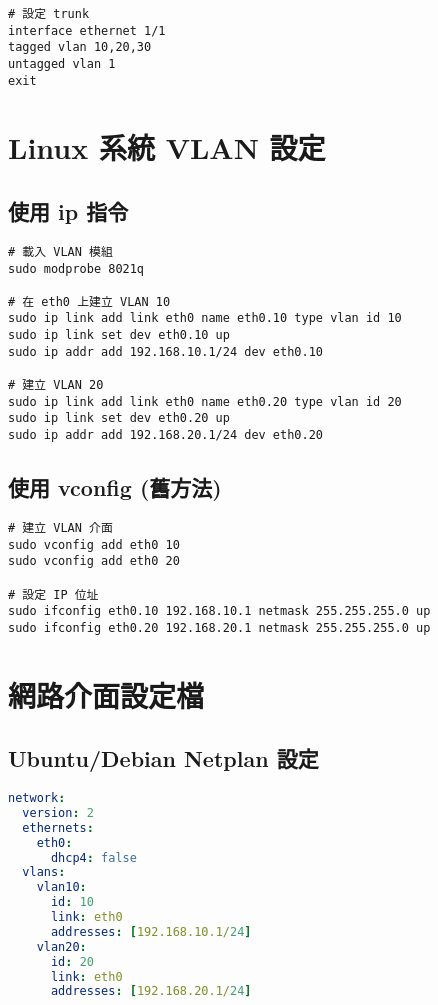 \documentclass[12pt,a4paper]{article}
\begin{document}
\begin{lstlisting}[caption=HP/Aruba Trunk 設定]
# 設定 trunk
interface ethernet 1/1
tagged vlan 10,20,30
untagged vlan 1
exit
\end{lstlisting}

\section{Linux 系統 VLAN 設定}

\subsection{使用 ip 指令}

\begin{lstlisting}[caption=建立 VLAN 介面]
# 載入 VLAN 模組
sudo modprobe 8021q

# 在 eth0 上建立 VLAN 10
sudo ip link add link eth0 name eth0.10 type vlan id 10
sudo ip link set dev eth0.10 up
sudo ip addr add 192.168.10.1/24 dev eth0.10

# 建立 VLAN 20
sudo ip link add link eth0 name eth0.20 type vlan id 20
sudo ip link set dev eth0.20 up
sudo ip addr add 192.168.20.1/24 dev eth0.20
\end{lstlisting}

\subsection{使用 vconfig (舊方法)}

\begin{lstlisting}[caption=vconfig 設定方法]
# 建立 VLAN 介面
sudo vconfig add eth0 10
sudo vconfig add eth0 20

# 設定 IP 位址
sudo ifconfig eth0.10 192.168.10.1 netmask 255.255.255.0 up
sudo ifconfig eth0.20 192.168.20.1 netmask 255.255.255.0 up
\end{lstlisting}

\section{網路介面設定檔}

\subsection{Ubuntu/Debian Netplan 設定}

\begin{lstlisting}[caption=/etc/netplan/01-netcfg.yaml,language=yaml]
network:
  version: 2
  ethernets:
    eth0:
      dhcp4: false
  vlans:
    vlan10:
      id: 10
      link: eth0
      addresses: [192.168.10.1/24]
    vlan20:
      id: 20
      link: eth0
      addresses: [192.168.20.1/24]
\end{lstlisting}
\end{document}
